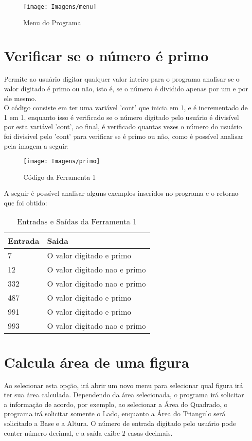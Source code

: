 \documentclass[12pt]{article}
\begin{document}
\begin{figure}[!htb]
     \centering
     \texttt{[image: Imagens/menu]}
     \caption{Menu do Programa}
     \label{Label de referência para a imagem}
\end{figure}

\newpage

\section{Verificar se o número é primo}
Permite ao usuário digitar qualquer valor inteiro para o programa analisar se o valor digitado é primo ou não, isto é, se o número é dividido apenas por um e por ele mesmo. \\
O código consiste em ter uma variável 'cont' que inicia em 1, e é incrementado de 1 em 1, enquanto isso é verificado se o número digitado pelo usuário é divisível por esta variável 'cont', ao final, é verificado quantas vezes o número do usuário foi divisível pelo 'cont' para verificar se é primo ou não, como é possível analisar pela imagem a seguir:

\begin{figure}[!htb]
     \centering
     \texttt{[image: Imagens/primo]}
     \caption{Código da Ferramenta 1}
     \label{Label de referência para a imagem}
\end{figure}

A seguir é possível analisar alguns exemplos inseridos no programa e o retorno que foi obtido:

\FloatBarrier
\begin{table}[ht]
\centering
\begin{tabular}{|l|l|}
\hline
\textbf{Entrada} & \textbf{Saida}\\
\hline
7 & O valor digitado e primo\\
12 & O valor digitado nao e primo\\
332 & O valor digitado nao e primo\\
487 & O valor digitado e primo\\
991 & O valor digitado e primo\\
993 & O valor digitado nao e primo\\

\hline
\end{tabular}
\caption{Entradas e Saídas da Ferramenta 1}
\end{table} 

\newpage

\section{Calcula área de uma figura}
Ao selecionar esta opção, irá abrir um novo menu para selecionar qual figura irá ter sua área calculada. Dependendo da área selecionada, o programa irá solicitar a informação de acordo, por exemplo, ao selecionar a Área do Quadrado, o programa irá solicitar somente o Lado, enquanto a Área do Triangulo será solicitado a Base e a Altura. O número de entrada digitado pelo usuário pode conter número decimal, e a saída exibe 2 casas decimais.
\end{document}
